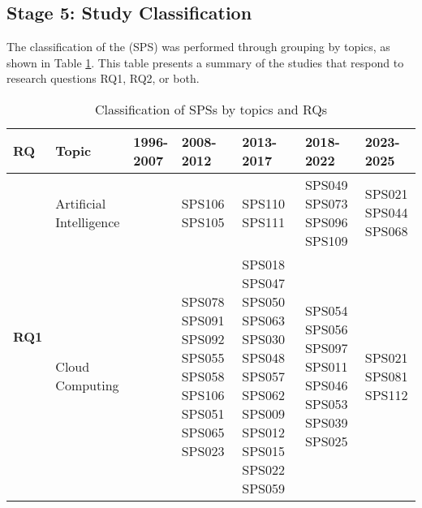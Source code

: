 \subsection{Stage 5: Study Classification}\label{subsec:clasificacion-de-estudios}
The classification of the (SPS) was performed through grouping by topics, as shown in Table \ref{table:sps_classification_by_topic_rq}. This table presents a summary of the studies that respond to research questions RQ1, RQ2, or both.

\begin{table}[htbp]
	\centering
	\caption{Classification of SPSs by topics and RQs}
	\label{table:sps_classification_by_topic_rq}
	\renewcommand{\arraystretch}{1.2}
	\setlength{\tabcolsep}{6pt}
	\begin{tabularx}{\textwidth}{p{0.8cm}p{2.5cm}>{\raggedright\arraybackslash}X>{\raggedright\arraybackslash}X>{\raggedright\arraybackslash}X>{\raggedright\arraybackslash}X>{\raggedright\arraybackslash}X}
		\toprule
		\textbf{RQ}                           & \textbf{Topic}          & \textbf{1996-2007}                                      & \textbf{2008-2012}                                                                                                            & \textbf{2013-2017}                                                                         & \textbf{2018-2022}                                                                  & \textbf{2023-2025}                 \\
		\midrule
		\multirow{12}{*}[-11em]{\textbf{RQ1}} & Artificial Intelligence &                                                         & SPS106 SPS105                                                                                                                 & SPS110 SPS111                                                                              & SPS049 SPS073 SPS096 SPS109                                                         & SPS021 SPS044 SPS068               \\
		\addlinespace[0.3em]
		                                      & Cloud Computing         &                                                         & SPS078 SPS091 SPS092 SPS055 SPS058 SPS106 SPS051 SPS065 SPS023                                                                & SPS018 SPS047 SPS050 SPS063 SPS030 SPS048 SPS057 SPS062 SPS009 SPS012 SPS015 SPS022 SPS059 & SPS054 SPS056 SPS097 SPS011 SPS046 SPS053 SPS039 SPS025                             & SPS021 SPS081 SPS112               \\

\end{tabularx}
\end{table}
